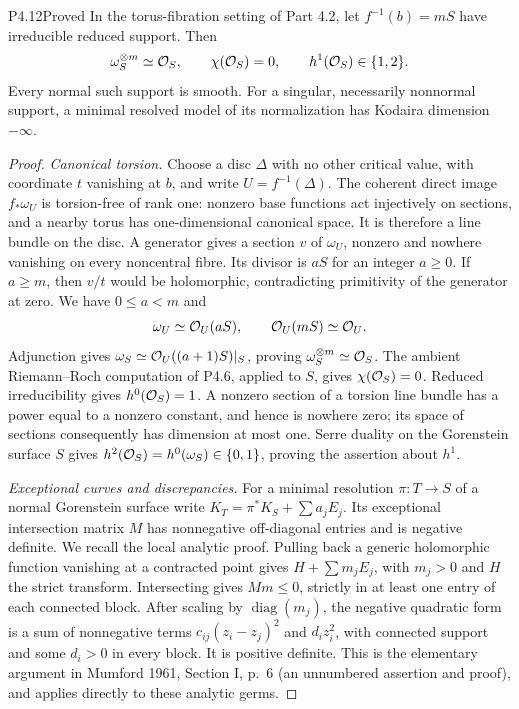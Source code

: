 \begin{statement}{P4.12}{Proved}
In the torus-fibration setting of Part 4.2, let $f^{-1}(b)=mS$
have irreducible reduced support. Then
\[
 \omega_S^{\otimes m}\simeq\mathcal O_S,\qquad
 \chi(\mathcal O_S)=0,\qquad h^1(\mathcal O_S)\in\{1,2\}.
\]
Every normal such support is smooth. For a singular, necessarily
nonnormal support, a minimal resolved model of its normalization
has Kodaira dimension $-\infty$.
\end{statement}
\begin{proof}
\emph{Canonical torsion.}
Choose a disc $\Delta$ with no other critical value, with coordinate
$t$ vanishing at $b$, and write $U=f^{-1}(\Delta)$. The coherent
direct image $f_*\omega_U$ is torsion-free of rank one: nonzero
base functions act injectively on sections, and a nearby torus has
one-dimensional canonical space. It is therefore a line bundle
on the disc. A generator gives a section $v$ of $\omega_U$,
nonzero and nowhere vanishing on every noncentral fibre. Its
divisor is $aS$ for an integer $a\ge0$. If $a\ge m$, then $v/t$
would be holomorphic, contradicting primitivity of the generator
at zero. We have $0\le a<m$ and
\[
 \omega_U\simeq\mathcal O_U(aS),\qquad\mathcal O_U(mS)\simeq\mathcal O_U.
\]
Adjunction gives $\omega_S\simeq\mathcal O_U((a+1)S)|_S$, proving
$\omega_S^{\otimes m}\simeq\mathcal O_S$. The ambient
Riemann--Roch computation of P4.6, applied to $S$, gives
$\chi(\mathcal O_S)=0$. Reduced irreducibility gives $h^0(\mathcal O_S)=1$.
A nonzero section of a torsion line bundle has a power equal to
a nonzero constant, and hence is nowhere zero; its space of
sections consequently has dimension at most one. Serre duality
on the Gorenstein surface $S$ gives
$h^2(\mathcal O_S)=h^0(\omega_S)\in\{0,1\}$, proving the assertion
about $h^1$.

\emph{Exceptional curves and discrepancies.}
For a minimal resolution $\pi:T\to S$ of a normal Gorenstein
surface write $K_T=\pi^*K_S+\sum a_jE_j$. Its exceptional
intersection matrix $M$ has nonnegative off-diagonal entries
and is negative definite. We recall the local analytic proof.
Pulling back a generic holomorphic function vanishing at a
contracted point gives $H+\sum m_jE_j$, with $m_j>0$ and $H$
the strict transform. Intersecting gives $Mm\le0$, strictly in
at least one entry of each connected block. After scaling by
$\operatorname{diag}(m_j)$, the negative quadratic form is a
sum of nonnegative terms $c_{ij}(z_i-z_j)^2$ and $d_i z_i^2$,
with connected support and some $d_i>0$ in every block. It is
positive definite. This is the elementary argument in Mumford
1961, Section I, p.~6 (an unnumbered assertion and proof), and
applies directly to these analytic germs.


\end{proof}
